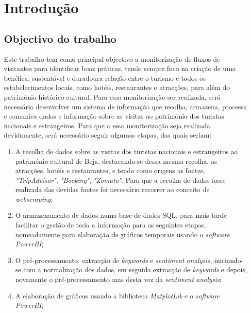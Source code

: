 \chapter{Introdução}
\label{intro}


\section{Objectivo do trabalho}
Este trabalho tem como principal objectivo a monitorização de fluxos de visitantes para identificar boas práticas, tendo sempre foco na criação de uma benéfica, sustentável e duradoura relação entre o turismo e todos os estabelecimentos locais, como hotéis, restaurantes e atracções, para além do património histórico-cultural. Para essa monitorização ser realizada, será necessário desenvolver um sistema de informação que recolha, armazena, processa e comunica dados e informação sobre as visitas ao património dos turistas nacionais e estrangeiros. Para que a essa monitorização seja realizada devidamente, será necessário seguir algumas etapas, das quais seriam:
\begin{enumerate}
  \setlength\itemsep{0.05em}
    \item A recolha de dados sobre as visitas dos turistas nacionais e estrangeiros ao património cultural de Beja, destacando-se dessa mesma recolha, as atracções, hotéis e restaurantes, e tendo como origens as fontes,  \textit{"TripAdvisor"}, \textit{"Booking"}, \textit{"Zomato"}. Para que a recolha de dados fosse realizada das devidas fontes foi necessário recorrer ao conceito de \textit{webscraping};
    \item O armazenamento de dados numa base de dados SQL, para mais tarde facilitar o gestão de toda a informação para as seguintes etapas, nomeadamente para elaboração de gráficos temporais usando o \textit{software PowerBI};
    \item O pré-processamento, extracção de \textit{keywords} e \textit{sentiment analysis}, iniciando-se com a normalização dos dados, em seguida extracção de \textit{keywords} e depois, novamente o pré-processamento mas desta vez da \textit{sentiment analysis};
    \item A elaboração de gráficos usando a biblioteca  \textit{MatplotLib} e o  \textit{software PowerBI};
\end{enumerate} 

